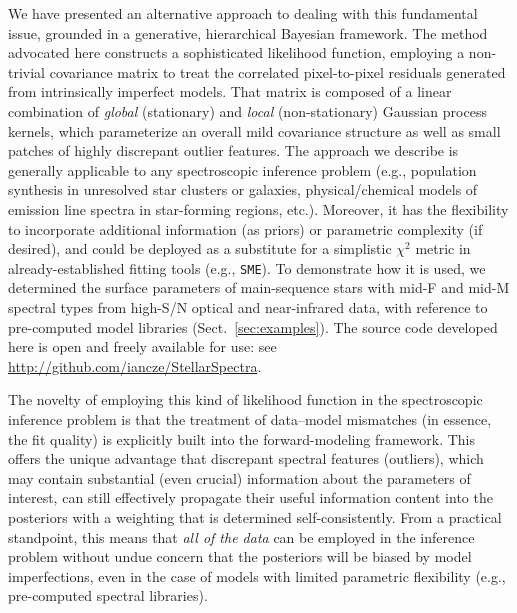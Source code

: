 \documentclass[iop,floatfix,twocolappendix]{emulateapj}
\begin{document}
We have presented an alternative approach to dealing with this fundamental issue, grounded in a 
generative, hierarchical Bayesian framework.  The method advocated here constructs a sophisticated 
likelihood function, employing a non-trivial covariance matrix to treat the correlated 
pixel-to-pixel residuals generated from intrinsically imperfect models.  That matrix is composed of 
a linear combination of {\it global} (stationary) and {\it local} (non-stationary) Gaussian 
process kernels, which parameterize an overall mild covariance structure as well as small patches 
of highly discrepant outlier features.  The approach we describe is generally applicable to any 
spectroscopic inference problem (e.g., population synthesis in unresolved star clusters or 
galaxies, physical/chemical models of emission line spectra in star-forming regions, etc.).  
Moreover, it has the flexibility to incorporate additional information (as priors) or parametric 
complexity (if desired), and could be deployed as a substitute for a simplistic $\chi^2$ metric in 
already-established fitting tools (e.g., {\tt SME}).  To demonstrate how it is used, we determined 
the surface parameters of main-sequence stars with mid-F and mid-M spectral types from high-S/N 
optical and near-infrared data, with reference to pre-computed model libraries 
(Sect.~\ref{sec:examples}).  The source code developed here is open and freely available for use: 
see \url{http://github.com/iancze/StellarSpectra}.

The novelty of employing this kind of likelihood function in the spectroscopic inference problem is 
that the treatment of data--model mismatches (in essence, the fit quality) is explicitly built into 
the forward-modeling framework.  This offers the unique advantage that discrepant spectral features 
(outliers), which may contain substantial (even crucial) information about the parameters of 
interest, can still effectively propagate their useful information content into the posteriors with 
a weighting that is determined self-consistently.  From a practical standpoint, this means that 
{\it all of the data} can be employed in the inference problem without undue concern that the 
posteriors will be biased by model imperfections, even in the case of models with limited 
parametric flexibility (e.g., pre-computed spectral libraries).
\end{document}
